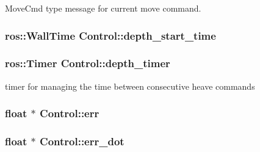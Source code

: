 Move\+Cmd type message for current move command. 

\subsubsection[{\texorpdfstring{depth\+\_\+start\+\_\+time}{depth_start_time}}]{\setlength{\rightskip}{0pt plus 5cm}ros\+::\+Wall\+Time Control\+::depth\+\_\+start\+\_\+time\hspace{0.3cm}{\ttfamily [private]}}\hypertarget{classControl_af1c6dd9d0fe3364d6104754e251de910}{}\label{classControl_af1c6dd9d0fe3364d6104754e251de910}
\subsubsection[{\texorpdfstring{depth\+\_\+timer}{depth_timer}}]{\setlength{\rightskip}{0pt plus 5cm}ros\+::\+Timer Control\+::depth\+\_\+timer\hspace{0.3cm}{\ttfamily [private]}}\hypertarget{classControl_a2fb8968d2bdfa14be8d7c6a1931ac3ad}{}\label{classControl_a2fb8968d2bdfa14be8d7c6a1931ac3ad}


timer for managing the time between consecutive heave commands 

\subsubsection[{\texorpdfstring{err}{err}}]{\setlength{\rightskip}{0pt plus 5cm}float $\ast$ Control\+::err\hspace{0.3cm}{\ttfamily [private]}}\hypertarget{classControl_a79e253da9e02d0b1c9bf35824c966cb5}{}\label{classControl_a79e253da9e02d0b1c9bf35824c966cb5}
\subsubsection[{\texorpdfstring{err\+\_\+dot}{err_dot}}]{\setlength{\rightskip}{0pt plus 5cm}float $\ast$ Control\+::err\+\_\+dot\hspace{0.3cm}{\ttfamily [private]}}\hypertarget{classControl_aef9f81ebc43231e739a2e58eb6b22605}{}\label{classControl_aef9f81ebc43231e739a2e58eb6b22605}
